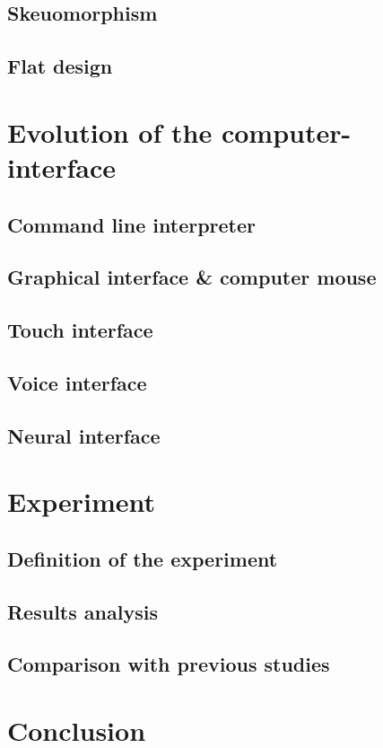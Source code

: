 \documentclass[a4paper,11pt] {article}
\theoremstyle{definition}
\begin{document}
\subsection{Skeuomorphism}
\subsection{Flat design}

\section{Evolution of the computer-interface}
\subsection{Command line interpreter}
\subsection{Graphical interface \& computer mouse}
\subsection{Touch interface}
\subsection{Voice interface}
\subsection{Neural interface}
\section{Experiment}
\subsection{Definition of the experiment}
\subsection{Results analysis}
\subsection{Comparison with previous studies}
\section{Conclusion}
\end{document}
